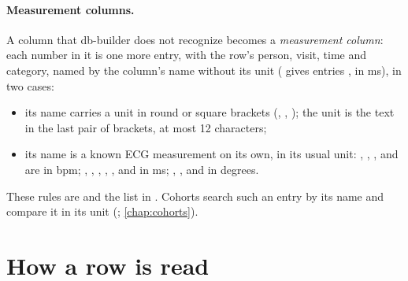 \paragraph{Measurement columns.} A column that db-builder does not recognize becomes a
\emph{measurement column}: each number in it is one more entry, with the row's person, visit,
time and category, named by the column's name without its unit ( gives entries
, in ms), in two cases:
\begin{itemize}
\item its name carries a unit in round or square brackets (, ,
  ); the unit is the text in the last pair of brackets, at most 12
  characters;
\item its name is a known ECG measurement on its own, in its usual unit: ,
  , ,  and  are in bpm;
  , , , , ,  and  in ms;
  , ,  and  in degrees.
\end{itemize}
These rules are  and the list  in
. Cohorts search such an entry by its name and compare it in its
unit (; \cref{chap:cohorts}).

\section{How a row is read}
\label{sec:importing-rows}


